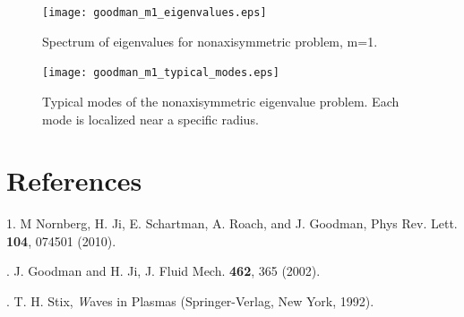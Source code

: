 \documentclass[letterpaper]{article}
\begin{document}
\begin{figure}
\begin{center}
\texttt{[image: goodman\_m1\_eigenvalues.eps]}
\caption{Spectrum of eigenvalues for nonaxisymmetric problem, m=1.}
\label{fig:goodmanm1eigenvalues}
\end{center}
\end{figure}

\begin{figure}
\begin{center}
\texttt{[image: goodman\_m1\_typical\_modes.eps]}
\caption{Typical modes of the nonaxisymmetric eigenvalue problem.
  Each mode is localized near a specific radius.}
\label{fig:goodmanm1typicalmodes}
\end{center}
\end{figure}


\section{References}
1. M Nornberg, H. Ji, E. Schartman, A. Roach, and J. Goodman, Phys
Rev. Lett. {\bf 104}, 074501 (2010).

. J. Goodman and H. Ji, J. Fluid Mech. {\bf 462}, 365 (2002).

. T. H. Stix, {\emph Waves in Plasmas} (Springer-Verlag,
New York, 1992).
\end{document}
